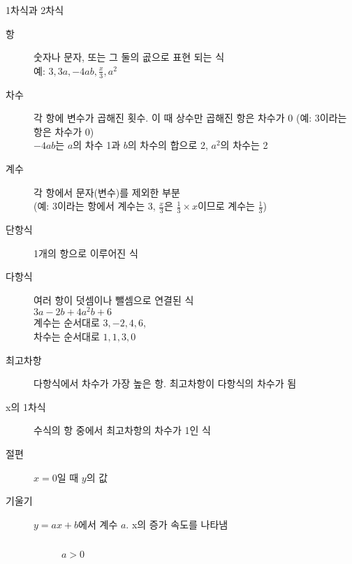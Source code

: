 \documentclass[10pt,t]{beamer}
\begin{document}
\begin{frame}{1차식과 2차식}
\begin{description}
    \item[항] 숫자나 문자, 또는 그 둘의 곲으로 표현 되는 식 \\
              예: $3, 3a, -4ab, \frac{x}{3}, a^{2}$
    \item[차수] 각 항에 변수가 곱해진 횟수. 이 때 상수만 곱해진 항은 차수가 0 (예: 3이라는 항은 차수가 0)\\ 
               $-4ab$는 $a$의 차수 1과 $b$의 차수의 합으로 2, $a^{2}$의 차수는 2
    \item[계수] 각 항에서 문자(변수)를 제외한 부분 \\(예: 3이라는 항에서 계수는 3, 
               $\frac{x}{3}$은 $\frac{1}{3}\times x$이므로 계수는 $\frac{1}{3}$)
    \item[단항식] 1개의 항으로 이루어진 식 
    \item[다항식] 여러 항이 덧셈이나 뺄셈으로 연결된 식\\
               $3a-2b +4a^{2}b+6$\\
               계수는 순서대로 $3, -2, 4, 6$, \\
               차수는 순서대로 $1, 1, 3, 0$
    \item[최고차항] 다항식에서 차수가 가장 높은 항. 최고차항이 다항식의 차수가 됨
    \item[x의 1차식] 수식의 항 중에서 최고차항의 차수가 1인 식 
    \item[절편] $x=0$일 때 $y$의 값
    \item[기울기] $y=ax+b$에서 계수 $a$. x의 증가 속도를 나타냄
    \begin{columns}
        \begin{figure}
            \caption{$a>0$}
        \end{figure}
        \begin{figure}
\end{figure}
\end{columns}
\end{description}
\end{frame}
\end{document}
